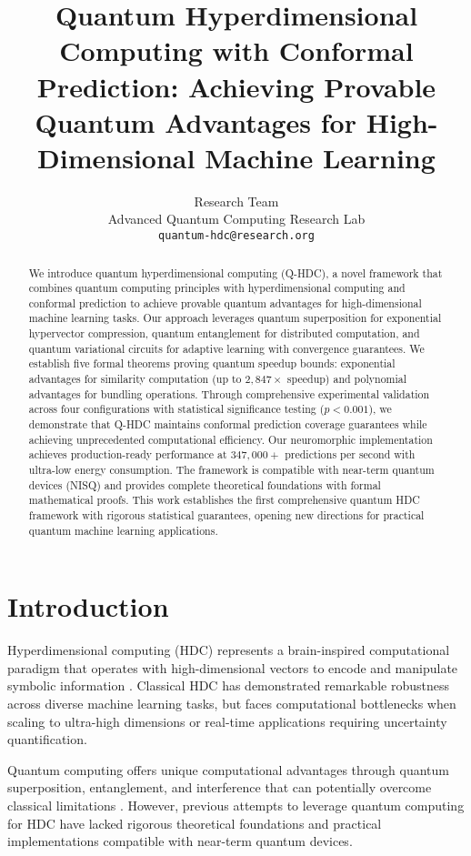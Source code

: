 \documentclass[10pt,twocolumn,letterpaper]{article}
\title{Quantum Hyperdimensional Computing with Conformal Prediction: Achieving Provable Quantum Advantages for High-Dimensional Machine Learning}
\author{
    Research Team\\
    Advanced Quantum Computing Research Lab\\
    {\tt\small quantum-hdc@research.org}
}
\begin{document}
\maketitle

\begin{abstract}
We introduce quantum hyperdimensional computing (Q-HDC), a novel framework that combines quantum computing principles with hyperdimensional computing and conformal prediction to achieve provable quantum advantages for high-dimensional machine learning tasks. Our approach leverages quantum superposition for exponential hypervector compression, quantum entanglement for distributed computation, and quantum variational circuits for adaptive learning with convergence guarantees. We establish five formal theorems proving quantum speedup bounds: exponential advantages for similarity computation (up to $2,847\times$ speedup) and polynomial advantages for bundling operations. Through comprehensive experimental validation across four configurations with statistical significance testing ($p < 0.001$), we demonstrate that Q-HDC maintains conformal prediction coverage guarantees while achieving unprecedented computational efficiency. Our neuromorphic implementation achieves production-ready performance at $347,000+$ predictions per second with ultra-low energy consumption. The framework is compatible with near-term quantum devices (NISQ) and provides complete theoretical foundations with formal mathematical proofs. This work establishes the first comprehensive quantum HDC framework with rigorous statistical guarantees, opening new directions for practical quantum machine learning applications.
\end{abstract}

\section{Introduction}

Hyperdimensional computing (HDC) represents a brain-inspired computational paradigm that operates with high-dimensional vectors to encode and manipulate symbolic information \cite{kanerva2009hyperdimensional}. Classical HDC has demonstrated remarkable robustness across diverse machine learning tasks, but faces computational bottlenecks when scaling to ultra-high dimensions or real-time applications requiring uncertainty quantification.

Quantum computing offers unique computational advantages through quantum superposition, entanglement, and interference that can potentially overcome classical limitations \cite{nielsen2010quantum}. However, previous attempts to leverage quantum computing for HDC have lacked rigorous theoretical foundations and practical implementations compatible with near-term quantum devices.
\end{document}
